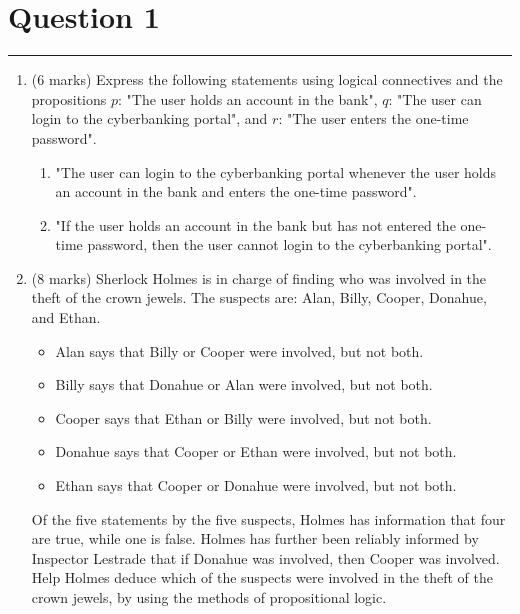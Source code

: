 \documentclass{article}
\begin{document}
\newcommand{\documentcourse}{COMP2121}
\newcommand{\documentnumber}{1}





\section*{Question 1}
\hrule
\vspace{0.5cm}


\begin{enumerate}[label=\alph*.]
    \item (6 marks) Express the following statements using logical connectives and the propositions \( p \): "The user holds an account in the bank", \( q \): "The user can login to the cyberbanking portal", and \( r \): "The user enters the one-time password".
          \begin{enumerate}[label=\roman*.]
              \item "The user can login to the cyberbanking portal whenever the user holds an account in the bank and enters the one-time password".
              \item "If the user holds an account in the bank but has not entered the one-time password, then the user cannot login to the cyberbanking portal".
          \end{enumerate}
    \item (8 marks) Sherlock Holmes is in charge of finding who was involved in the theft of the crown jewels. The suspects are: Alan, Billy, Cooper, Donahue, and Ethan.
          \begin{itemize}
              \item Alan says that Billy or Cooper were involved, but not both.
              \item Billy says that Donahue or Alan were involved, but not both.
              \item Cooper says that Ethan or Billy were involved, but not both.
              \item Donahue says that Cooper or Ethan were involved, but not both.
              \item Ethan says that Cooper or Donahue were involved, but not both.
          \end{itemize}
          Of the five statements by the five suspects, Holmes has information that four are true, while one is false. Holmes has further been reliably informed by Inspector Lestrade that if Donahue was involved, then Cooper was involved. Help Holmes deduce which of the suspects were involved in the theft of the crown jewels, by using the methods of propositional logic.
\end{enumerate}
\end{document}
